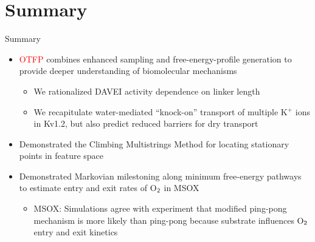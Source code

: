 \documentclass[10pt]{beamer}
\begin{document}




%





%



%



%

\section{Summary}

\begin{frame}[fragile]{Summary}
\begin{itemize}
\item \textcolor{red}{OTFP} combines enhanced sampling and free-energy-profile generation to provide deeper understanding of biomolecular mechanisms
\begin{itemize}
\item We rationalized DAVEI activity dependence on linker length
\item We recapitulate water-mediated ``knock-on'' transport of multiple K$^+$ ions in Kv1.2, but also predict reduced barriers for dry transport
\end{itemize}
\item Demonstrated the \textcolor{magenta!80!black}{Climbing Multistrings Method} for locating stationary points in feature space
\item Demonstrated \textcolor{green!80!black}{Markovian milestoning} along minimum free-energy pathways to estimate entry and exit rates of O$_{\sf 2}$ in MSOX
\begin{itemize}
\item MSOX: Simulations agree with experiment that modified ping-pong mechanism is more likely than ping-pong because substrate influences O$_{\sf 2}$
entry and exit kinetics
\end{itemize}
\end{itemize}
\end{frame}


\end{document}
